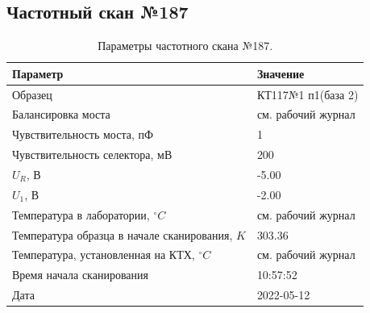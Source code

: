 \subsection{Частотный скан №187}
\begin{table}[!ht]
    \centering
    \caption{Параметры частотного скана №187.}
    \begin{tabular}{|l|l|}
        \hline
        Параметр                                       & Значение                  \\ \hline
        Образец                                        & КТ117№1 п1(база 2)        \\ \hline
        Балансировка моста                             & см. рабочий журнал        \\ \hline
        Чувствительность моста, пФ                     & 1                         \\ \hline
        Чувствительность селектора, мВ                 & 200                       \\ \hline
        $U_R$, В                                       & -5.00                     \\ \hline
        $U_1$, В                                       & -2.00                     \\ \hline
        Температура в лаборатории, $^\circ C$          & см. рабочий журнал        \\ \hline
        Температура образца в начале сканирования, $K$ & 303.36                    \\ \hline
        Температура, установленная на КТХ, $^\circ C$  & см. рабочий журнал        \\ \hline
        Время начала сканирования                      & 10:57:52                  \\ \hline
        Дата                                           & 2022-05-12                \\ \hline
    \end{tabular}
    \label{table:frequency_scan_187}
\end{table}

